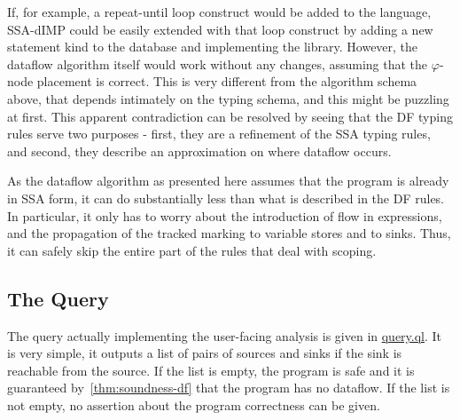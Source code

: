 If, for example, a repeat-until loop construct would be added to the language,
SSA-dIMP could be easily extended with that loop construct by adding a new statement 
kind to the database and implementing the library.
However, the dataflow algorithm itself would work without any changes, assuming that
the $\varphi$-node placement is correct.
This is very different from the algorithm schema above, that depends intimately on the 
typing schema, and this might be puzzling at first.
This apparent contradiction can be resolved by seeing that the DF typing 
rules serve two purposes - first, they are a refinement of the SSA typing rules,
and second, they describe an approximation on where dataflow occurs.

As the dataflow algorithm as presented here assumes that the program is already in 
SSA form, it can do substantially less than what is described in the DF rules.
In particular, it only has to worry about the introduction of flow in expressions,
and the propagation of the tracked marking to variable stores and to sinks.
Thus, it can safely skip the entire part of the rules that deal with scoping.

\subsection{The Query}
The query actually implementing the user-facing analysis is given in \hyperref[lst:query]{query.ql}.
It is very simple, it outputs a list of pairs of sources and sinks if the
sink is reachable from the source.
If the list is empty, the program is safe and it is guaranteed by~\autoref{thm:soundness-df}
that the program has no dataflow.
If the list is not empty, no assertion about the program correctness can be given.
